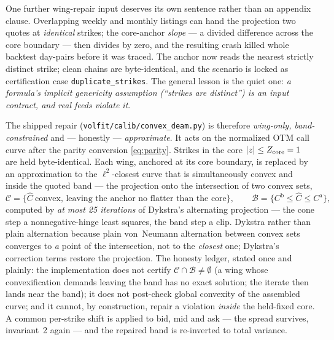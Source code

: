 \documentclass[11pt]{article}
\begin{document}
\begin{remark}
\label{rem:dupstrikes}
One further wing-repair input deserves its own sentence rather than an
appendix clause.  Overlapping weekly and monthly listings can hand the
projection two quotes at \emph{identical} strikes; the core-anchor
\emph{slope} --- a divided difference across the core boundary --- then
divides by zero, and the resulting crash killed whole backtest day-pairs
before it was traced.  The anchor now reads the nearest strictly distinct
strike; clean chains are byte-identical, and the scenario is locked as
certification case \texttt{duplicate\_strikes}.  The general lesson is the
quiet one: \emph{a formula's implicit genericity assumption (``strikes are
distinct'') is an input contract, and real feeds violate it}.
\end{remark}

The shipped repair (\texttt{volfit/calib/convex\_deam.py}) is therefore
\emph{wing-only, band-constrained} and --- honestly --- \emph{approximate}.
It acts on the normalized OTM call curve after the parity conversion
\eqref{eq:parity}.  Strikes in the core $\lvert z\rvert\le Z_{\mathrm{core}}=1$
are held byte-identical.  Each wing, anchored at its core boundary, is
replaced by an approximation to the $\ell^2$-closest curve that is
simultaneously convex and inside the quoted band --- the projection onto
the intersection of two convex sets,
\begin{equation}
\mathcal C=\{\hat C\ \text{convex, leaving the anchor no flatter than the
core}\},\qquad
\mathcal B=\{C^{\mathrm b}\le\hat C\le C^{\mathrm a}\},
\label{eq:sets}
\end{equation}
computed by \emph{at most 25 iterations} of Dykstra's alternating
projection \cite{BoyleDykstra1986} --- the cone step a
nonnegative-hinge least squares, the band step a clip.  Dykstra rather
than plain alternation because plain von~Neumann alternation between
convex sets converges to \emph{a} point of the intersection, not to the
\emph{closest} one; Dykstra's correction terms restore the projection.
The honesty ledger, stated once and plainly: the implementation does not
certify $\mathcal C\cap\mathcal B\ne\emptyset$ (a wing whose
convexification demands leaving the band has no exact solution; the
iterate then lands near the band); it does not post-check global convexity
of the assembled curve; and it cannot, by construction, repair a violation
\emph{inside} the held-fixed core.  A common per-strike shift is applied
to bid, mid and ask --- the spread survives, invariant~2 again --- and the
repaired band is re-inverted to total variance.
\end{document}
